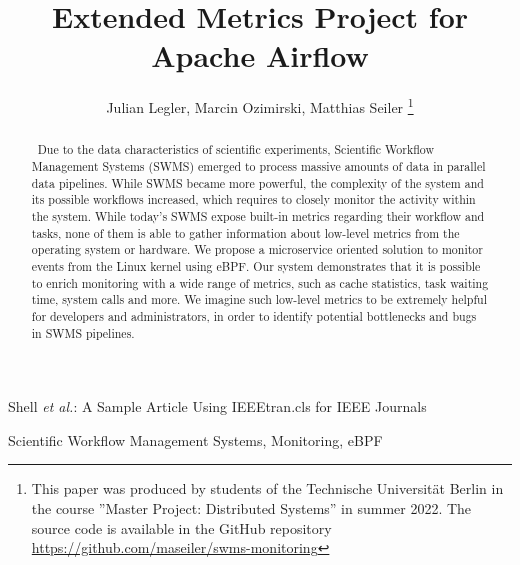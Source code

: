 \documentclass[a4paper,journal]{IEEEtran}
\begin{document}
	
\title{Extended Metrics Project for Apache Airflow}%



\author{Julian Legler, Marcin Ozimirski, Matthias Seiler
	\thanks{This paper was produced by students of the Technische Universität Berlin in the course ''Master Project: Distributed Systems'' in summer 2022. The source code is available in the GitHub repository \url{https://github.com/maseiler/swms-monitoring}}%
}

%
{Shell \MakeLowercase{\textit{et al.}}: A Sample Article Using IEEEtran.cls for IEEE Journals}


\maketitle

\begin{abstract}
~Due to the data characteristics of scientific experiments, Scientific Workflow Management Systems (SWMS) emerged to process massive amounts of data in parallel data pipelines. While SWMS became more powerful, the complexity of the system and its possible workflows increased, which requires to closely monitor the activity within the system.
While today's SWMS expose built-in metrics regarding their workflow and tasks, none of them is able to gather information about low-level metrics from the operating system or hardware. 
We propose a microservice oriented solution to monitor events from the Linux kernel using eBPF. 
Our system demonstrates that it is possible to enrich monitoring with a wide range of metrics, such as cache statistics, task waiting time, system calls and more.
We imagine such low-level metrics to be extremely helpful for developers and administrators, in order to identify potential bottlenecks and bugs in SWMS pipelines. 

\end{abstract}

\begin{IEEEkeywords}
	Scientific Workflow Management Systems, Monitoring, eBPF
\end{IEEEkeywords}
\end{document}
